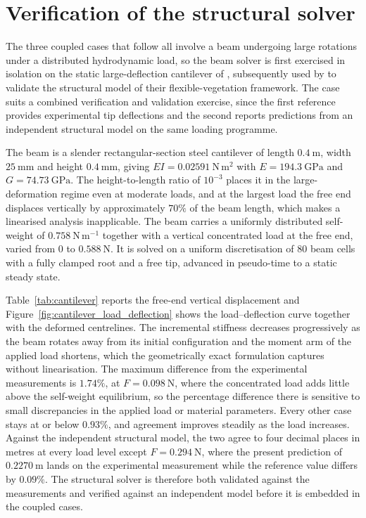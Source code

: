 \section{Verification of the structural solver}
\label{sec:cantilever}

\noindent
The three coupled cases that follow all involve a beam undergoing large rotations under a distributed hydrodynamic load, so the beam solver is first exercised in isolation on the static large-deflection cantilever of \citet{belendez_numerical_2003}, subsequently used by \citet{chen_eulerianlagrangian_2019} to validate the structural model of their flexible-vegetation framework. The case suits a combined verification and validation exercise, since the first reference provides experimental tip deflections and the second reports predictions from an independent structural model on the same loading programme.

\noindent
The beam is a slender rectangular-section steel cantilever of length $0.4~\mathrm{m}$, width $25~\mathrm{mm}$ and height $0.4~\mathrm{mm}$, giving $EI = 0.02591~\mathrm{N\,m^2}$ with $E = 194.3~\mathrm{GPa}$ and $G = 74.73~\mathrm{GPa}$. The height-to-length ratio of $10^{-3}$ places it in the large-deformation regime even at moderate loads, and at the largest load the free end displaces vertically by approximately $70\%$ of the beam length, which makes a linearised analysis inapplicable. The beam carries a uniformly distributed self-weight of $0.758~\mathrm{N\,m^{-1}}$ together with a vertical concentrated load at the free end, varied from $0$ to $0.588~\mathrm{N}$. It is solved on a uniform discretisation of $80$ beam cells with a fully clamped root and a free tip, advanced in pseudo-time to a static steady state.

\noindent
Table~\ref{tab:cantilever} reports the free-end vertical displacement and Figure~\ref{fig:cantilever_load_deflection} shows the load--deflection curve together with the deformed centrelines. The incremental stiffness decreases progressively as the beam rotates away from its initial configuration and the moment arm of the applied load shortens, which the geometrically exact formulation captures without linearisation. The maximum difference from the experimental measurements is $1.74\%$, at $F = 0.098~\mathrm{N}$, where the concentrated load adds little above the self-weight equilibrium, so the percentage difference there is sensitive to small discrepancies in the applied load or material parameters. Every other case stays at or below $0.93\%$, and agreement improves steadily as the load increases. Against the independent structural model, the two agree to four decimal places in metres at every load level except $F = 0.294~\mathrm{N}$, where the present prediction of $0.2270~\mathrm{m}$ lands on the experimental measurement while the reference value differs by $0.09\%$. The structural solver is therefore both validated against the measurements and verified against an independent model before it is embedded in the coupled cases.

